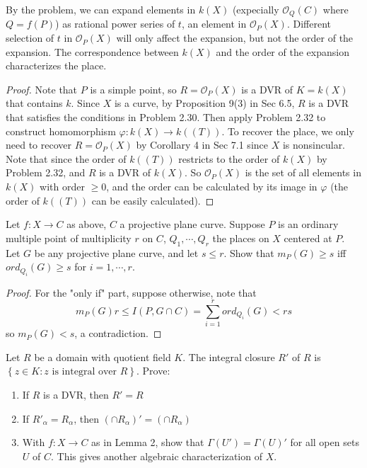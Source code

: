 \documentclass{solution}
\begin{document}
By the problem, we can expand elements in $k(X)$ (expecially $\mathcal{O}_{Q}(C)$ where $Q = f(P)$) as rational power series of $t$, an element in $\mathcal{O}_{P}(X)$. Different selection of $t$ in $\mathcal{O}_{P}(X)$ will only affect the expansion, but not the order of the expansion. The correspondence between $k(X)$ and the order of the expansion characterizes the place.

\begin{proof}
    Note that $P$ is a simple point, so $R = \mathcal{O}_{P}(X)$ is a DVR of $K = k(X)$ that contains $k$. Since $X$ is a curve, by Proposition 9(3) in Sec 6.5, $R$ is a DVR that satisfies the conditions in Problem 2.30. Then apply Problem 2.32 to construct homomorphism $\varphi: k(X) \rightarrow k((T))$. To recover the place, we only need to recover $R = \mathcal{O}_{P}(X)$ by Corollary 4 in Sec 7.1 since $X$ is nonsincular. Note that since the order of $k((T))$ restricts to the order of $k(X)$ by Problem 2.32, and $R$ is a DVR of $k(X)$. So $\mathcal{O}_{P}(X)$ is the set of all elements in $k(X)$ with order $\ge 0$, and the order can be calculated by its image in $\varphi$ (the order of $k((T))$ can be easily calculated).
\end{proof}

\begin{problem}{7.19}
    Let $f: X \rightarrow C$ as above, $C$ a projective plane curve. Suppose $P$ is an ordinary multiple point of multiplicity $r$ on $C$, $Q_1, \cdots, Q_r$ the places on $X$ centered at $P$. Let $G$ be any projective plane curve, and let $s \le r$. Show that $m_P(G) \ge s$ iff $ord_{Q_i}(G) \ge s$ for $i = 1, \cdots, r$. 
\end{problem}

\begin{proof}
    \TODO 

    For the "only if" part, suppose otherwise, note that
    $$m_P(G) r \le I(P, G \cap C) = \sum\limits_{i = 1}^{r} ord_{Q_i}(G)\lt rs$$
    so $m_P(G) \lt s$, a contradiction.
\end{proof}

\begin{problem}{7.20}
    Let $R$ be a domain with quotient field $K$. The integral closure $R'$ of $R$ is $\left\lbrace z \in K: z \text{ is integral over }R \right\rbrace$. Prove:
    \begin{enumerate}
        \item If $R$ is a DVR, then $R' = R$
        \item If $R'_{\alpha} = R_{\alpha}$, then $(\cap R_{\alpha})' = (\cap R_{\alpha})$
        \item With $f: X \rightarrow C$ as in Lemma 2, show that $\Gamma(U') = \Gamma(U)'$ for all open sets $U$ of $C$. This gives another algebraic characterization of $X$.
    \end{enumerate}
\end{problem}
\end{document}
